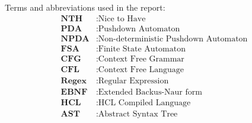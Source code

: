 
Terms and abbreviations used in the report:
\begin{align*}
    \textbf{NTH} &: \text{Nice to Have} \\
    \textbf{PDA} &: \text{Pushdown Automaton} \\
    \textbf{NPDA} &: \text{Non-deterministic Pushdown Automaton} \\
    \textbf{FSA} &: \text{Finite State Automaton} \\
    \textbf{CFG} &: \text{Context Free Grammar} \\
    \textbf{CFL} &: \text{Context Free Language} \\
    \textbf{Regex} &: \text{Regular Expression} \\
    \textbf{EBNF} &: \text{Extended Backus-Naur form} \\
    \textbf{HCL} &: \text{HCL Compiled Language} \\
    \textbf{AST} &: \text{Abstract Syntax Tree} \\
\end{align*}